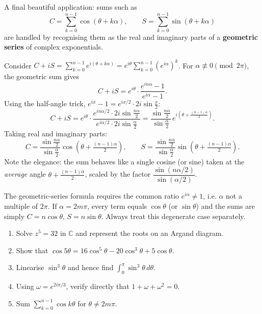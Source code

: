 \documentclass[11pt]{article}
\begin{document}
A final beautiful application: sums such as
\[
C=\sum_{k=0}^{n-1}\cos(\theta+k\alpha),\qquad S=\sum_{k=0}^{n-1}\sin(\theta+k\alpha)
\]
are handled by recognising them as the real and imaginary parts of a \textbf{geometric series} of complex exponentials.

\begin{exemplebox}
Consider $C+iS=\displaystyle\sum_{k=0}^{n-1}e^{i(\theta+k\alpha)}=e^{i\theta}\sum_{k=0}^{n-1}\left(e^{i\alpha}\right)^k$.
For $\alpha\not\equiv0\pmod{2\pi}$, the geometric sum gives
\[
C+iS=e^{i\theta}\cdot\frac{e^{in\alpha}-1}{e^{i\alpha}-1}.
\]
Using the half-angle trick, $e^{ix}-1=e^{ix/2}\cdot2i\sin\frac{x}{2}$:
\[
C+iS=e^{i\theta}\cdot\frac{e^{in\alpha/2}\cdot2i\sin\frac{n\alpha}{2}}{e^{i\alpha/2}\cdot2i\sin\frac{\alpha}{2}}
=\frac{\sin\frac{n\alpha}{2}}{\sin\frac{\alpha}{2}}\,e^{i\left(\theta+\frac{(n-1)\alpha}{2}\right)}.
\]
Taking real and imaginary parts:
\[
\boxed{\;C=\frac{\sin\frac{n\alpha}{2}}{\sin\frac{\alpha}{2}}\cos\!\left(\theta+\tfrac{(n-1)\alpha}{2}\right),\qquad
S=\frac{\sin\frac{n\alpha}{2}}{\sin\frac{\alpha}{2}}\sin\!\left(\theta+\tfrac{(n-1)\alpha}{2}\right).\;}
\]
Note the elegance: the sum behaves like a single cosine (or sine) taken at the \emph{average} angle $\theta+\frac{(n-1)\alpha}{2}$, scaled by the factor $\dfrac{\sin(n\alpha/2)}{\sin(\alpha/2)}$.
\end{exemplebox}

\begin{attention}
The geometric-series formula requires the common ratio $e^{i\alpha}\neq1$, i.e. $\alpha$ not a multiple of $2\pi$. If $\alpha=2m\pi$, every term equals $\cos\theta$ (or $\sin\theta$) and the sums are simply $C=n\cos\theta$, $S=n\sin\theta$. Always treat this degenerate case separately.
\end{attention}

\begin{exercice}[Practice]
\begin{enumerate}
\item Solve $z^5=32$ in $\mathbb{C}$ and represent the roots on an Argand diagram.
\item Show that $\cos5\theta=16\cos^5\theta-20\cos^3\theta+5\cos\theta$.
\item Linearise $\sin^3\theta$ and hence find $\displaystyle\int_0^{\pi}\sin^3\theta\,d\theta$.
\item Using $\omega=e^{2i\pi/3}$, verify directly that $1+\omega+\omega^2=0$.
\item Sum $\displaystyle\sum_{k=0}^{n-1}\cos k\theta$ for $\theta\neq2m\pi$.
\end{enumerate}
\end{exercice}
\end{document}
